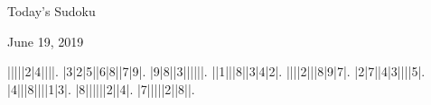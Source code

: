 \documentclass{article}
\begin{document}
\begin{center}
\Huge{Today's Sudoku}
\end{center}
\begin{center}
\Large{June 19, 2019}
\end{center}
\begin{sudoku}
|||||2|4||||.
|3|2|5||6|8||7|9|.
|9|8||3||||||.
||1|||8||3|4|2|.
||||2|||8|9|7|.
|2|7||4|3||||5|.
|4|||8||||1|3|.
|8||||||2||4|.
|7|||||2||8||.
\end{sudoku}
\end{document}
